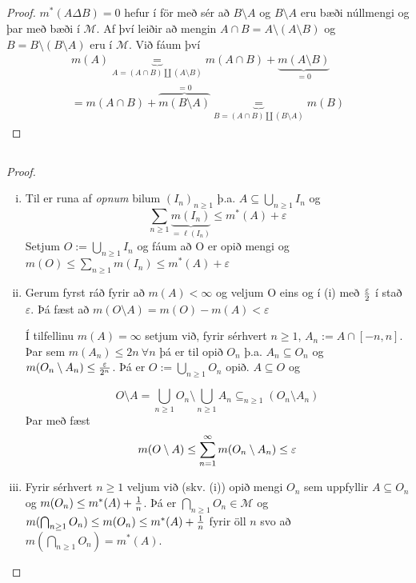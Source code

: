 \documentclass[12pt]{book}
\newcommand{\cM}{\mathcal{M}}
\begin{document}
\subsection{}
\begin{proof}
  $m^*(A \Delta B) = 0$ hefur í för með sér að $B \setminus A$ og $B \setminus A$
  eru bæði núllmengi og þar með bæði í $\cM$. Af því leiðir að mengin
  $ A \cap B = A \setminus (A \setminus B) $ og $B = B \setminus (B \setminus A)$
  eru í $\cM$.
  Við fáum því
  \begin{gather*}
    m(A) \underbrace{=}_{A = (A \cap B) \amalg (A \setminus B)} m( A \cap
    B) + \underbrace{m(A \setminus B)}_{= 0}\\
    = m(A \cap B) + \overbrace{m(B \setminus A)}^{= 0} \underbrace{=}_{B = (A \cap B) \amalg
      (B \setminus A)} m(B)
  \end{gather*}
\end{proof}

\subsection{}

\begin{proof}
  \begin{enumerate}[(i)]
  \item Til er runa af \emph{opnum} bilum $(I_n)_{n \geq 1}$ þ.a.
    $A \subseteq \bigcup_{n \geq 1} I_n$ og
    \[ \sum_{n \geq 1} \underbrace{m(I_n)}_{= \ell(I_n)} \leq m^*(A) + \varepsilon \]
    Setjum $O := \bigcup_{n \geq 1} I_n$ og fáum að O er opið mengi og
    $ m(O) \leq \sum_{n \geq 1} m(I_n) \leq m^*(A) + \varepsilon$
  \item Gerum fyrst ráð fyrir að $m(A) < \infty$ og veljum O eins og í (i) með
    $\frac{\varepsilon}{2}$ í stað $\varepsilon$.
    Þá fæst að $m(O \setminus A) = m(O) - m(A) < \varepsilon$

    Í tilfellinu $m(A) = \infty$ setjum við, fyrir sérhvert $n \geq 1$,
    $A_n := A \cap [-n,n]$.
    Þar sem $m(A_n) \leq 2 n \: \forall n$
    þá er til opið $O_n$ þ.a. $A_n \subseteq O_n$
    og $m(O_n \setminus A_n) \leq \frac{\varepsilon}{2^n}$.
    Þá er $O := \bigcup_{n \geq 1} O_n$ opið.
    $A \subseteq O$ og 

\[O \setminus A = \bigcup_{n \geq 1} O_n \setminus \bigcup_{n \geq 1} A_n \subseteq_{n \geq 1} (O_n \setminus A_n)\]
Þar með fæst \[ m(O \setminus A) \leq \sum_{n = 1}^{\infty} m(O_n \setminus A_n) \leq \varepsilon \]
   
\item Fyrir sérhvert $n \geq 1$ veljum við  (skv. (i)) opið mengi
$O_n$ sem uppfyllir $A \subseteq O_n$ og $m(O_n) \leq m^*(A) + \frac{1}{n}$. Þá er 
$\bigcap_{n\geq 1} O_n \in \cM$ og $m(\bigcap_{n\geq 1} O_n) \leq m(O_n) \leq m^*(A) + \frac{1}{n} $
fyrir öll $n$ svo að $m(\bigcap_{n \geq 1} O_n) = m^*(A)$.

  \end{enumerate}
\end{proof}
\end{document}
